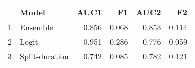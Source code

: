 \begin{table}[ht]
\centering
\begin{tabular}{rlrrrr}
  \hline
 & Model & AUC1 & F1 & AUC2 & F2 \\ 
  \hline
1 & Ensemble & 0.856 & 0.068 & 0.853 & 0.114 \\ 
  2 & Logit & 0.951 & 0.286 & 0.776 & 0.059 \\ 
  3 & Split-duration & 0.742 & 0.085 & 0.782 & 0.121 \\ 
   \hline
\end{tabular}
\end{table}

